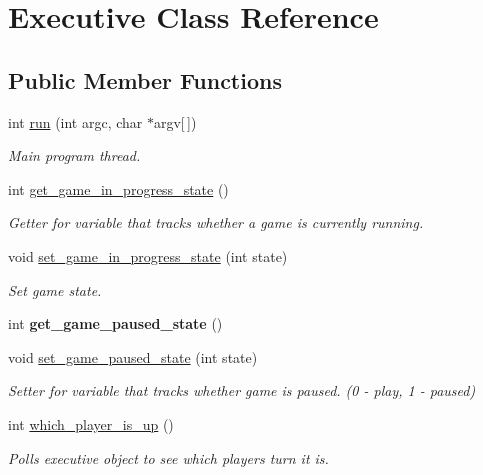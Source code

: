 \hypertarget{classExecutive}{}\section{Executive Class Reference}
\label{classExecutive}
\subsection*{Public Member Functions}
\begin{DoxyCompactItemize}
\item 
int \mbox{\hyperlink{classExecutive_a0e233ad87bd0e0d438e4da3888327b8b}{run}} (int argc, char $\ast$argv\mbox{[}$\,$\mbox{]})
\begin{DoxyCompactList}\small\item\em Main program thread. \end{DoxyCompactList}\item 
int \mbox{\hyperlink{classExecutive_aa18c7d0914c7332188968681132809d0}{get\+\_\+game\+\_\+in\+\_\+progress\+\_\+state}} ()
\begin{DoxyCompactList}\small\item\em Getter for variable that tracks whether a game is currently running. \end{DoxyCompactList}\item 
void \mbox{\hyperlink{classExecutive_ac2be719a9026307aeb3dbc2e81297a84}{set\+\_\+game\+\_\+in\+\_\+progress\+\_\+state}} (int state)
\begin{DoxyCompactList}\small\item\em Set game state. \end{DoxyCompactList}\item 
\mbox{\label{classExecutive_a50f84e87213028bb5f479b41ecdfd070}} 
int {\bfseries get\+\_\+game\+\_\+paused\+\_\+state} ()
\item 
void \mbox{\hyperlink{classExecutive_a660154fa665ba56fda1279e48ad69486}{set\+\_\+game\+\_\+paused\+\_\+state}} (int state)
\begin{DoxyCompactList}\small\item\em Setter for variable that tracks whether game is paused. (0 -\/ play, 1 -\/ paused) \end{DoxyCompactList}\item 
int \mbox{\hyperlink{classExecutive_af910b08a89311aeb591440a58a6338f0}{which\+\_\+player\+\_\+is\+\_\+up}} ()
\begin{DoxyCompactList}\small\item\em Polls executive object to see which player\textquotesingle{}s turn it is. \end{DoxyCompactList}\item 

\end{DoxyCompactItemize}

